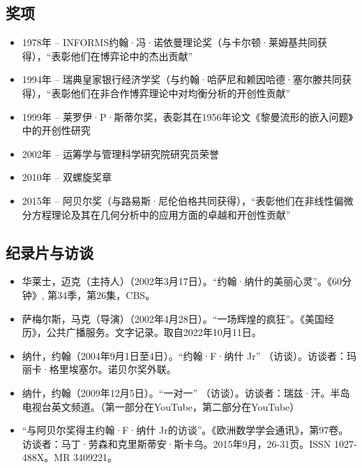 \subsection{奖项}  
\begin{itemize}
\item 1978年 – INFORMS约翰·冯·诺依曼理论奖（与卡尔顿·莱姆基共同获得），“表彰他们在博弈论中的杰出贡献”  
\item 1994年 – 瑞典皇家银行经济学奖（与约翰·哈萨尼和赖因哈德·塞尔滕共同获得），“表彰他们在非合作博弈理论中对均衡分析的开创性贡献”  
\item 1999年 – 莱罗伊·P·斯蒂尔奖，表彰其在1956年论文《黎曼流形的嵌入问题》中的开创性研究  
\item 2002年 – 运筹学与管理科学研究院研究员荣誉  
\item 2010年 – 双螺旋奖章  
\item 2015年 – 阿贝尔奖（与路易斯·尼伦伯格共同获得），“表彰他们在非线性偏微分方程理论及其在几何分析中的应用方面的卓越和开创性贡献”
\end{itemize}
\subsection{纪录片与访谈}  
\begin{itemize}
\item 华莱士，迈克（主持人）（2002年3月17日）。“约翰·纳什的美丽心灵”。《60分钟》, 第34季，第26集，CBS。  
\item 萨梅尔斯，马克（导演）（2002年4月28日）。“一场辉煌的疯狂”。《美国经历》，公共广播服务。文字记录。取自2022年10月11日。  
\item 纳什，约翰（2004年9月1日至4日）。“约翰·F·纳什 Jr” （访谈）。访谈者：玛丽卡·格里埃塞尔。诺贝尔奖外联。  
\item 纳什，约翰（2009年12月5日）。“一对一” （访谈）。访谈者：瑞兹·汗。半岛电视台英文频道。（第一部分在YouTube，第二部分在YouTube）  
\item “与阿贝尔奖得主约翰·F·纳什 Jr的访谈”。《欧洲数学学会通讯》，第97卷。访谈者：马丁·劳森和克里斯蒂安·斯卡乌。2015年9月，26-31页。ISSN 1027-488X。MR 3409221。
\end{itemize}
